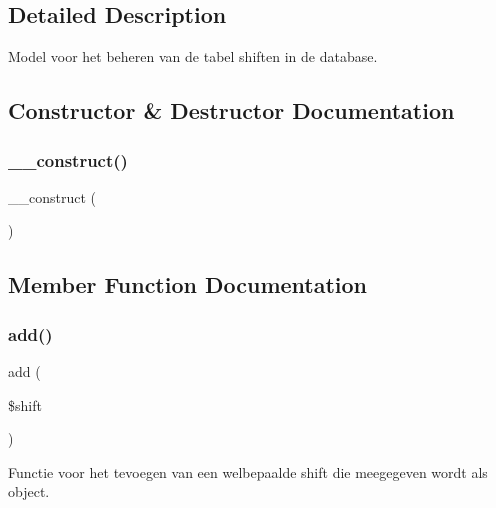 \subsection{Detailed Description}
Model voor het beheren van de tabel shiften in de database. 

\subsection{Constructor \& Destructor Documentation}
\mbox{\label{class_shiften___model_a095c5d389db211932136b53f25f39685}} 
\subsubsection{\texorpdfstring{\+\_\+\+\_\+construct()}{\_\_construct()}}
{\footnotesize\ttfamily \+\_\+\+\_\+construct (\begin{DoxyParamCaption}{ }\end{DoxyParamCaption})}



\subsection{Member Function Documentation}
\mbox{\label{class_shiften___model_a3fc76f85c3f3f387825bd98a099eb973}} 
\subsubsection{\texorpdfstring{add()}{add()}}
{\footnotesize\ttfamily add (\begin{DoxyParamCaption}\item[{}]{\$shift }\end{DoxyParamCaption})}



Functie voor het tevoegen van een welbepaalde shift die meegegeven wordt als object. 

\mbox{\label{class_shiften___model_a2f8258add505482d7f00ea26493a5723}} 
